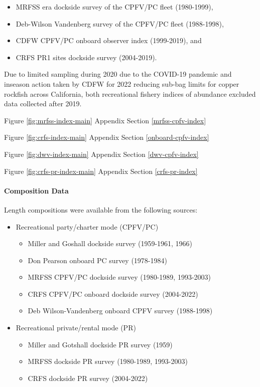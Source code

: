 \documentclass[11pt,
  english,
  letterpaper,
]{article}
\providecommand{\tightlist}{%
  \setlength{\itemsep}{0pt}\setlength{\parskip}{0pt}}
\providecommand{\tightlist}{%
  \setlength{\itemsep}{0pt}\setlength{\parskip}{0pt}}
\begin{document}
\begin{itemize}
\tightlist
\item
  MRFSS era dockside survey of the CPFV/PC fleet (1980-1999),
\item
  Deb-Wilson Vandenberg survey of the CPFV/PC fleet (1988-1998),
\item
  CDFW CPFV/PC onboard observer index (1999-2019), and
\item
  CRFS PR1 sites dockside survey (2004-2019).
\end{itemize}

Due to limited sampling during 2020 due to the COVID-19 pandemic and inseason action taken by CDFW for 2022 reducing sub-bag limits for copper rockfish across California, both recreational fishery indices of abundance excluded data collected after 2019.

Figure \ref{fig:mrfss-index-main} Appendix Section \ref{mrfss-cpfv-index}

Figure \ref{fig:crfs-index-main} Appendix Section \ref{onboard-cpfv-index}

Figure \ref{fig:dwv-index-main} Appendix Section \ref{dwv-cpfv-index}

Figure \ref{fig:crfs-pr-index-main} Appendix Section \ref{crfs-pr-index}

\hypertarget{composition-data-1}{%
\paragraph{Composition Data}\label{composition-data-1}}

\hfill\break
Length compositions were available from the following sources:

\begin{itemize}
\item
  Recreational party/charter mode (CPFV/PC)

  \begin{itemize}
  \tightlist
  \item
    Miller and Goshall dockside survey (1959-1961, 1966)
  \item
    Don Pearson onboard PC survey (1978-1984)
  \item
    MRFSS CPFV/PC dockside survey (1980-1989, 1993-2003)
  \item
    CRFS CPFV/PC onboard dockside survey (2004-2022)
  \item
    Deb Wilson-Vandenberg onboard CPFV survey (1988-1998)
  \end{itemize}
\item
  Recreational private/rental mode (PR)

  \begin{itemize}
  \tightlist
  \item
    Miller and Gotshall dockside PR survey (1959)
  \item
    MRFSS dockside PR survey (1980-1989, 1993-2003)
  \item
    CRFS dockside PR survey (2004-2022)
  \end{itemize}
\end{itemize}
\end{document}
